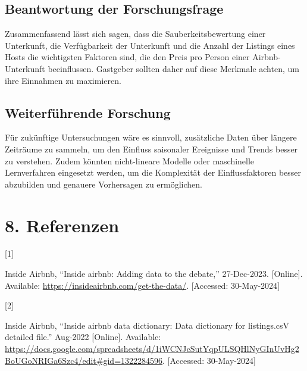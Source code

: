 \documentclass[
  journal,
]{IEEEtran}%
\newlength{\cslhangindent}
\newlength{\csllabelwidth}
\newenvironment{CSLReferences}[2] %
 {\begin{list}{}{%
  \setlength{\itemindent}{0pt}
  \setlength{\leftmargin}{0pt}
  \setlength{\parsep}{0pt}
  \ifodd #1
   \setlength{\leftmargin}{\cslhangindent}
   \setlength{\itemindent}{-1\cslhangindent}
  \fi
  \setlength{\itemsep}{#2\baselineskip}}}
 {\end{list}}
\newcommand{\CSLLeftMargin}[1]{\parbox[t]{\csllabelwidth}{\strut#1\strut}}
\newcommand{\CSLRightInline}[1]{\parbox[t]{\linewidth - \csllabelwidth}{\strut#1\strut}}
\providecommand{\bibfont}{\footnotesize}
\begin{document}
\subsection{Beantwortung der
Forschungsfrage}\label{beantwortung-der-forschungsfrage}

Zusammenfassend lässt sich sagen, dass die Sauberkeitsbewertung einer
Unterkunft, die Verfügbarkeit der Unterkunft und die Anzahl der Listings
eines Hosts die wichtigsten Faktoren sind, die den Preis pro Person
einer Airbnb-Unterkunft beeinflussen. Gastgeber sollten daher auf diese
Merkmale achten, um ihre Einnahmen zu maximieren.

\subsection{Weiterführende Forschung}\label{weiterfuxfchrende-forschung}

Für zukünftige Untersuchungen wäre es sinnvoll, zusätzliche Daten über
längere Zeiträume zu sammeln, um den Einfluss saisonaler Ereignisse und
Trends besser zu verstehen. Zudem könnten nicht-lineare Modelle oder
maschinelle Lernverfahren eingesetzt werden, um die Komplexität der
Einflussfaktoren besser abzubilden und genauere Vorhersagen zu
ermöglichen.

\section*{8. Referenzen}\label{referenzen}

\label{refs}
\begin{CSLReferences}{0}{0}
\CSLLeftMargin{{[}1{]} }%
\CSLRightInline{Inside Airbnb, {``Inside airbnb: Adding data to the
debate,''} 27-Dec-2023. {[}Online{]}. Available:
\url{https://insideairbnb.com/get-the-data/}. {[}Accessed:
30-May-2024{]}}

\CSLLeftMargin{{[}2{]} }%
\CSLRightInline{Inside Airbnb, {``Inside airbnb data dictionary: Data
dictionary for listings.csV detailed file.''} Aug-2022 {[}Online{]}.
Available:
\url{https://docs.google.com/spreadsheets/d/1iWCNJcSutYqpULSQHlNyGInUvHg2BoUGoNRIGa6Szc4/edit\#gid=1322284596}.
{[}Accessed: 30-May-2024{]}}

\end{CSLReferences}


\ifCLASSOPTIONcaptionsoff
  \newpage
\fi



\pagebreak[3]
\end{document}
